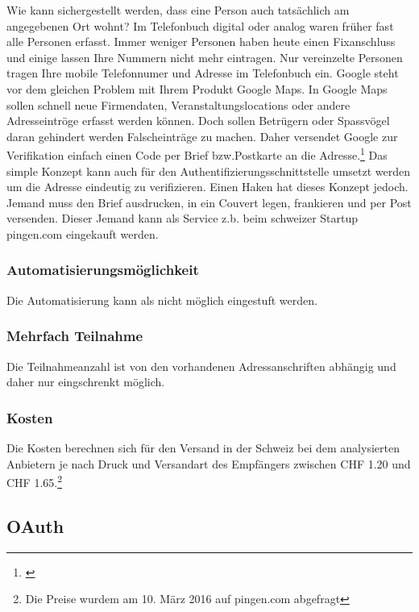 Wie kann sichergestellt werden, dass eine Person auch tatsächlich am
angegebenen Ort wohnt? Im Telefonbuch digital oder analog waren früher
fast alle Personen erfasst. Immer weniger Personen haben heute einen
Fixanschluss und einige lassen Ihre Nummern nicht mehr eintragen. Nur
vereinzelte Personen tragen Ihre mobile Telefonnumer und Adresse im
Telefonbuch ein. Google steht vor dem gleichen Problem mit Ihrem Produkt
Google Maps. In Google Maps sollen schnell neue Firmendaten,
Veranstaltungslocations oder andere Adresseintröge erfasst werden
können. Doch sollen Betrügern oder Spassvögel daran gehindert werden
Falscheinträge zu machen. Daher versendet Google zur Verifikation
einfach einen Code per Brief bzw.Postkarte an die Adresse.\footnote{\autocite{googlebusiness}}
Das simple Konzept kann auch für den Authentifizierungsschnittstelle
umsetzt werden um die Adresse eindeutig zu verifizieren. Einen Haken hat
dieses Konzept jedoch. Jemand muss den Brief ausdrucken, in ein Couvert
legen, frankieren und per Post versenden. Dieser Jemand kann als Service
z.b. beim schweizer Startup pingen.com eingekauft werden.

\subsubsection{Automatisierungsmöglichkeit}\label{automatisierungsmuxf6glichkeit-5}

Die Automatisierung kann als nicht möglich eingestuft werden.

\subsubsection{Mehrfach Teilnahme}\label{mehrfach-teilnahme-5}

Die Teilnahmeanzahl ist von den vorhandenen Adressanschriften abhängig
und daher nur eingschrenkt möglich.

\subsubsection{Kosten}\label{kosten-6}

Die Kosten berechnen sich für den Versand in der Schweiz bei dem
analysierten Anbietern je nach Druck und Versandart des Empfängers
zwischen CHF 1.20 und CHF 1.65.\footnote{Die Preise wurdem am 10. März
  2016 auf pingen.com abgefragt}

\hypertarget{oauth-1}{\subsection{OAuth}\label{oauth-1}}

